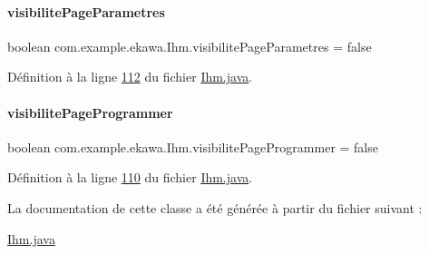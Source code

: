 \paragraph{\texorpdfstring{visibilite\+Page\+Parametres}{visibilitePageParametres}}
{\footnotesize\ttfamily boolean com.\+example.\+ekawa.\+Ihm.\+visibilite\+Page\+Parametres = false\hspace{0.3cm}{\ttfamily [private]}}



Définition à la ligne \hyperlink{_ihm_8java_source_l00112}{112} du fichier \hyperlink{_ihm_8java_source}{Ihm.\+java}.

\mbox{\label{classcom_1_1example_1_1ekawa_1_1_ihm_a1db719bfa9b48f6c1f64259e37703963}} 
\paragraph{\texorpdfstring{visibilite\+Page\+Programmer}{visibilitePageProgrammer}}
{\footnotesize\ttfamily boolean com.\+example.\+ekawa.\+Ihm.\+visibilite\+Page\+Programmer = false\hspace{0.3cm}{\ttfamily [private]}}



Définition à la ligne \hyperlink{_ihm_8java_source_l00110}{110} du fichier \hyperlink{_ihm_8java_source}{Ihm.\+java}.



La documentation de cette classe a été générée à partir du fichier suivant \+:\begin{DoxyCompactItemize}
\item 
\hyperlink{_ihm_8java}{Ihm.\+java}\end{DoxyCompactItemize}
